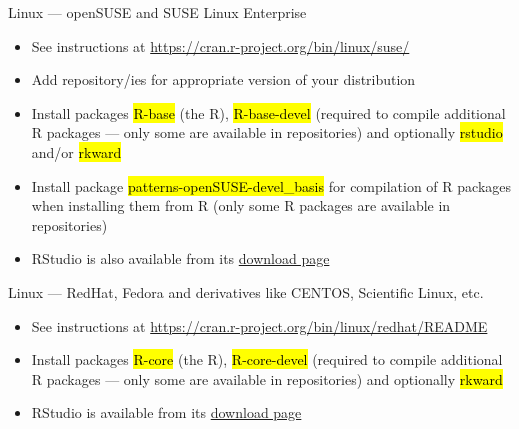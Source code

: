 \documentclass[compress, ucs, xelatex, 11pt, xcolor=svgnames,
  hyperref={
    bookmarks=true,
    unicode=true,
    colorlinks=true,
    pdftitle={Molecular data in R},
    plainpages=false,
    pdfauthor={Vojtech Zeisek},
    pdfsubject={Course about phylogeny and evolution in R},
    pdfcreator={XeLaTeX},
    pdfkeywords={R, evolution, phylogeny, molecular data},
    linkcolor=Tomato,
    anchorcolor=SaddleBrown,
    citecolor=Goldenrod,
    filecolor=DarkMagenta,
    menucolor=Sienna,
    urlcolor=DarkTurquoise,
    pdftex},
  url={hyphens, lowtilde} %
  ]{beamer}
\renewcommand{\texttt}[1]{\hl{\ttfamily #1}}
\begin{document}
\begin{frame}{Linux --- openSUSE and SUSE Linux Enterprise}
  \begin{itemize}
    \item See instructions at \url{https://cran.r-project.org/bin/linux/suse/}
    \item Add repository/ies for appropriate version of your distribution
    \begin{itemize}
    \end{itemize}
    \item Install packages \texttt{R-base} (the R), \texttt{R-base-devel} (required to compile additional R packages --- only some are available in repositories) and optionally \texttt{rstudio} and/or \texttt{rkward}
    \item Install package \texttt{patterns-openSUSE-devel\_basis} for compilation of R packages when installing them from R (only some R packages are available in repositories)
    \item RStudio is also available from its \href{https://www.rstudio.com/products/rstudio/download/\#download}{download page}
  \end{itemize}
\end{frame}

\begin{frame}{Linux --- RedHat, Fedora and derivatives like CENTOS, Scientific Linux, etc.}
  \begin{itemize}
    \item See instructions at \url{https://cran.r-project.org/bin/linux/redhat/README}
    \item Install packages \texttt{R-core} (the R), \texttt{R-core-devel} (required to compile additional R packages --- only some are available in repositories) and optionally \texttt{rkward}
    \item RStudio is available from its \href{https://www.rstudio.com/products/rstudio/download/\#download}{download page}
  \end{itemize}
\end{frame}
\end{document}
